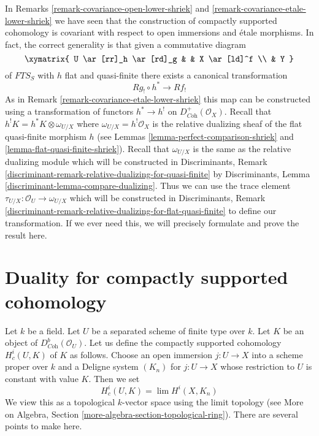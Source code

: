 \begin{remark}
\label{remark-covariance-lower-shriek}
In Remarks \ref{remark-covariance-open-lower-shriek} and
\ref{remark-covariance-etale-lower-shriek} we have seen
that the construction of compactly supported cohomology is
covariant with respect to open immersions and \'etale morphisms.
In fact, the correct generality is that given a commutative diagram
$$
\xymatrix{
U \ar[rr]_h \ar[rd]_g & & X \ar[ld]^f \\
& Y
}
$$
of $\textit{FTS}_S$ with $h$ flat and quasi-finite there exists a
canonical transformation
$$
Rg_! \circ h^* \longrightarrow Rf_!
$$
As in Remark \ref{remark-covariance-etale-lower-shriek}
this map can be constructed using a transformation of functors
$h^* \to h^!$ on $D^+_{\textit{Coh}}(\mathcal{O}_X)$. Recall that
$h^!K = h^*K \otimes \omega_{U/X}$ where $\omega_{U/X} = h^!\mathcal{O}_X$
is the relative dualizing sheaf of the flat quasi-finite morphism $h$ (see
Lemmas \ref{lemma-perfect-comparison-shriek} and
\ref{lemma-flat-quasi-finite-shriek}).
Recall that $\omega_{U/X}$ is the same as the relative dualizing
module which will be constructed in Discriminants, Remark
\ref{discriminant-remark-relative-dualizing-for-quasi-finite}
by
Discriminants, Lemma \ref{discriminant-lemma-compare-dualizing}.
Thus we can use the trace element
$\tau_{U/X} : \mathcal{O}_U \to \omega_{U/X}$
which will be constructed in Discriminants, Remark
\ref{discriminant-remark-relative-dualizing-for-flat-quasi-finite}
to define our transformation.
If we ever need this, we will precisely formulate
and prove the result here.
\end{remark}







\section{Duality for compactly supported cohomology}
\label{section-duality-compactly-supported}

\noindent
Let $k$ be a field. Let $U$ be a separated scheme of finite type over $k$.
Let $K$ be an object of $D^b_{\textit{Coh}}(\mathcal{O}_U)$. Let us define
the compactly supported cohomology $H^i_c(U, K)$ of $K$ as follows.
Choose an open immersion $j : U \to X$ into a scheme proper over $k$
and a Deligne system $(K_n)$ for $j : U \to X$ whose restriction
to $U$ is constant with value $K$. Then we set
$$
H^i_c(U, K) = \lim H^i(X, K_n)
$$
We view this as a topological $k$-vector space using the limit topology
(see More on Algebra, Section \ref{more-algebra-section-topological-ring}).
There are several points to make here.

